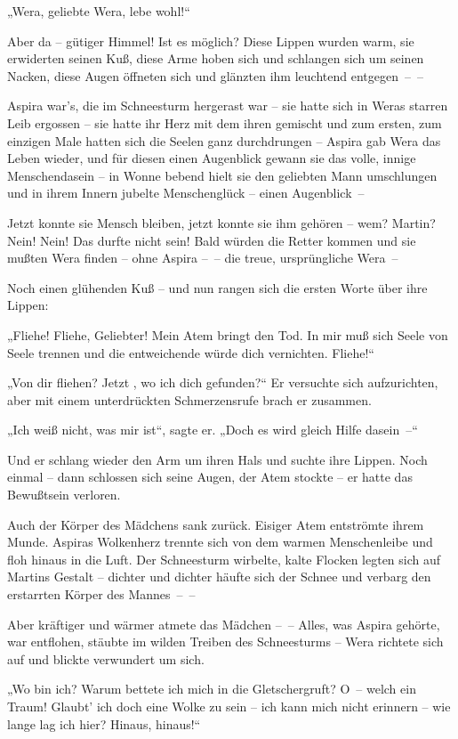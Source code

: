„Wera, geliebte Wera, lebe wohl!“

Aber da – gütiger Himmel! Ist es möglich? Diese Lippen wurden warm,
sie erwiderten seinen Kuß, diese Arme hoben sich und schlangen sich
um seinen Nacken, diese Augen öffneten sich und glänzten ihm
leuchtend entgegen~–~–

Aspira war's, die im Schneesturm hergerast war – sie hatte sich in
Weras starren Leib ergossen – sie hatte ihr Herz mit dem ihren
gemischt und zum ersten, zum einzigen Male hatten sich die Seelen
ganz durchdrungen – Aspira gab Wera das Leben wieder, und für
diesen einen Augenblick gewann sie das volle, innige Menschendasein
– in Wonne bebend hielt sie den geliebten Mann umschlungen und in
ihrem Innern jubelte Menschenglück – einen Augenblick~–

Jetzt konnte sie Mensch bleiben, jetzt konnte sie ihm gehören –
wem? Martin? Nein! Nein! Das durfte nicht sein! Bald würden die
Retter kommen und sie mußten Wera finden – ohne Aspira –~– die
treue, ursprüngliche Wera~–

Noch einen glühenden Kuß – und nun rangen sich die ersten Worte
über ihre Lippen:

„Fliehe! Fliehe, Geliebter! Mein Atem bringt den Tod. In mir muß
sich Seele von Seele trennen und die entweichende würde dich
vernichten. Fliehe!“

„Von dir fliehen? Jetzt , wo ich dich gefunden?“ Er versuchte sich
aufzurichten, aber mit einem unterdrückten Schmerzensrufe brach er
zusammen.

„Ich weiß nicht, was mir ist“, sagte er. „Doch es wird gleich Hilfe
dasein~–“

Und er schlang wieder den Arm um ihren Hals und suchte ihre Lippen.
Noch einmal – dann schlossen sich seine Augen, der Atem stockte –
er hatte das Bewußtsein verloren.

Auch der Körper des Mädchens sank zurück. Eisiger Atem entströmte
ihrem Munde. Aspiras Wolkenherz trennte sich von dem warmen
Menschenleibe und floh hinaus in die Luft. Der Schneesturm
wirbelte, kalte Flocken legten sich auf Martins Gestalt – dichter
und dichter häufte sich der Schnee und verbarg den erstarrten
Körper des Mannes~–~–

Aber kräftiger und wärmer atmete das Mädchen –~– Alles, was Aspira
gehörte, war entflohen, stäubte im wilden Treiben des Schneesturms
– Wera richtete sich auf und blickte verwundert um sich.

„Wo bin ich? Warum bettete ich mich in die Gletschergruft? O~–
welch ein Traum! Glaubt' ich doch eine Wolke zu sein – ich kann
mich nicht erinnern – wie lange lag ich hier? Hinaus, hinaus!“

